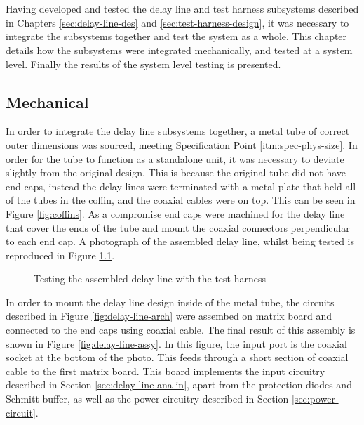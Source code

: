 \chapter{} \label{sec:sys-integration}
Having developed and tested the delay line and test harness subsystems described in Chapters \ref{sec:delay-line-des} and \ref{sec:test-harness-design}, it was necessary to integrate the subsystems together and test the system as a whole. This chapter details how the subsystems were integrated mechanically, and tested at a system level. Finally the results of the system level testing is presented.

\section{Mechanical}
In order to integrate the delay line subsystems together, a metal tube of correct outer dimensions was sourced, meeting Specification Point \ref{itm:spec-phys-size}. In order for the tube to function as a standalone unit, it was necessary to deviate slightly from the original design. This is because the original tube did not have end caps, instead the delay lines were terminated with a metal plate that held all of the tubes in the coffin, and the coaxial cables were on top. This can be seen in Figure \ref{fig:coffins}. As a compromise end caps were machined for the delay line that cover the ends of the tube and mount the coaxial connectors perpendicular to each end cap. A photograph of the assembled delay line, whilst being tested is reproduced in Figure \ref{fig:delay-line-testing}.

\begin{figure}[ht]
	\centering
	\caption{Testing the assembled delay line with the test harness}
	\label{fig:delay-line-testing}
\end{figure}

In order to mount the delay line design inside of the metal tube, the circuits described in Figure \ref{fig:delay-line-arch} were assembed on matrix board and connected to the end caps using coaxial cable. The final result of this assembly is shown in Figure \ref{fig:delay-line-assy}. In this figure, the input port is the coaxial socket at the bottom of the photo. This feeds through a short section of coaxial cable to the first matrix board. This board implements the input circuitry described in Section \ref{sec:delay-line-ana-in}, apart from the protection diodes and Schmitt buffer, as well as the power circuitry described in Section \ref{sec:power-circuit}.

